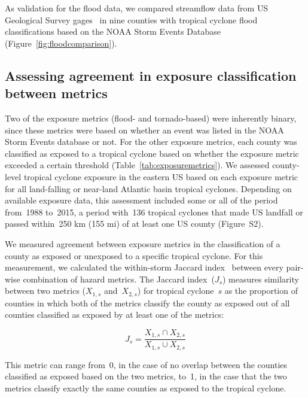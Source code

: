 As validation for the flood data, we compared streamflow data from \ac{US}
Geological Survey gages~\parencite{usgsgages, countyfloods, dataRetrieval} in nine
counties with tropical cyclone flood classifications based on the NOAA Storm
Events Database (Figure~\ref{fig:floodcomparison}).

\subsection*{Assessing agreement in exposure classification between
metrics}

Two of the exposure metrics (flood- and tornado-based) were inherently binary,
since these metrics were based on whether an event was listed in the NOAA Storm
Events database or not.  For the other exposure metrics, each county was
classified as exposed to a tropical cyclone based on whether the exposure
metric exceeded a certain threshold (Table~\ref{tab:exposuremetrics}). We
assessed county-level tropical cyclone exposure in the eastern \ac{US} based on
each exposure metric for all land-falling or near-land Atlantic basin tropical
cyclones. Depending on available exposure data, this assessment included some
or all of the period from~1988 to~2015, a period with~136 tropical cyclones
that made \ac{US} landfall or passed within~250 \si{\kilo\metre} (155 mi) of at
least one \ac{US} county (Figure~S2).

We measured agreement between exposure metrics in the classification of a
county as exposed or unexposed to a specific tropical cyclone. For this
measurement, we calculated the within-storm Jaccard
index~\parencite{jaccard1901distribution, jaccard1908nouvelles} between every
pair-wise combination of hazard metrics.  The Jaccard index~($J_s$) measures
similarity between two metrics ($X_{1,s}$ and~$X_{2,s}$) for tropical
cyclone~$s$ as the proportion of counties in which both of the metrics classify
the county as exposed out of all counties classified as exposed by at least one
of the metrics:

\begin{equation} 
J_s = \frac{X_{1,s} \cap X_{2,s}}{X_{1,s} \cup X_{2,s}}
\end{equation}

\noindent This metric can range from~0, in the case of no overlap between the
counties classified as exposed based on the two metrics, to~1, in the case that
the two metrics classify exactly the same counties as exposed to the tropical
cyclone.

